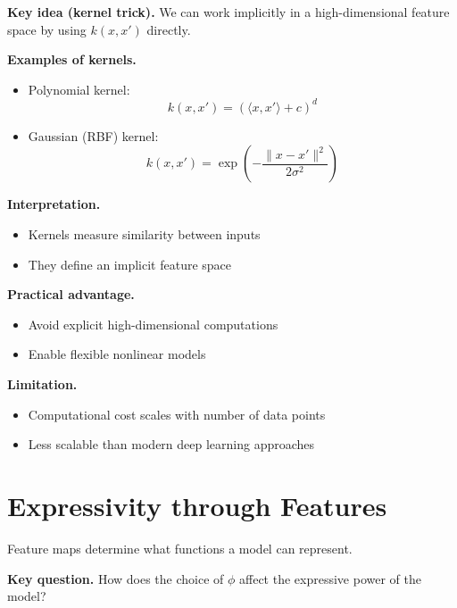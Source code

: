 \medskip

\noindent
\textbf{Key idea (kernel trick).}  
We can work implicitly in a high-dimensional feature space by using $k(x,x')$ directly.

\medskip

\noindent
\textbf{Examples of kernels.}
\begin{itemize}
    \item Polynomial kernel:
    \[
    k(x,x') = (\langle x, x' \rangle + c)^d
    \]

    \item Gaussian (RBF) kernel:
    \[
    k(x,x') = \exp\left(-\frac{\|x - x'\|^2}{2\sigma^2}\right)
    \]
\end{itemize}

\medskip

\noindent
\textbf{Interpretation.}
\begin{itemize}
    \item Kernels measure similarity between inputs
    \item They define an implicit feature space
\end{itemize}

\medskip

\noindent
\textbf{Practical advantage.}
\begin{itemize}
    \item Avoid explicit high-dimensional computations
    \item Enable flexible nonlinear models
\end{itemize}

\medskip

\noindent
\textbf{Limitation.}
\begin{itemize}
    \item Computational cost scales with number of data points
    \item Less scalable than modern deep learning approaches
\end{itemize}

\section{Expressivity through Features}

Feature maps determine what functions a model can represent.

\medskip

\noindent
\textbf{Key question.}  
How does the choice of $\phi$ affect the expressive power of the model?

\medskip

